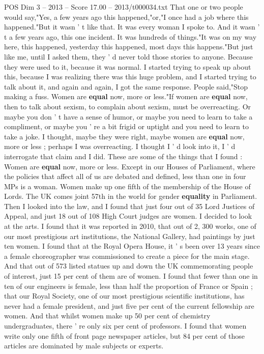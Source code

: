 \begin{textsample}{POS Dim 3 – 2013 – Score 17.00 – 2013/t000034.txt}
That one or two people would say,"Yes, a few years ago this happened,"or,"I once had a job where this happened."But it wasn ' t like that.
It was every woman I spoke to.
And it wasn ' t a few years ago, this one incident.
It was hundreds of things."It was on my way here, this happened, yesterday this happened, most days this happens."But just like me, until I asked them, they ' d never told those stories to anyone.
Because they were used to it, because it was normal.
I started trying to speak up about this, because I was realizing there was this huge problem, and I started trying to talk about it, and again and again, I got the same response.
People said,"Stop making a fuss.
Women are \textbf{equal} now, more or less."If women are \textbf{equal} now, then to talk about sexism, to complain about sexism, must be overreacting.
Or maybe you don ' t have a sense of humor, or maybe you need to learn to take a compliment, or maybe you ' re a bit frigid or uptight and you need to learn to take a joke.
I thought, maybe they were right, maybe women are \textbf{equal} now, more or less ; perhaps I was overreacting.
I thought I ' d look into it, I ' d interrogate that claim and I did.
These are some of the things that I found : Women are \textbf{equal} now, more or less.
Except in our Houses of Parliament, where the policies that affect all of us are debated and defined, less than one in four MPs is a woman.
Women make up one fifth of the membership of the House of Lords.
The UK comes joint 57th in the world for gender \textbf{equality} in Parliament.
Then I looked into the law, and I found that just four out of 35 Lord Justices of Appeal, and just 18 out of 108 High Court judges are women.
I decided to look at the arts.
I found that it was reported in 2010, that out of 2, 300 works, one of our most prestigious art institutions, the National Gallery, had paintings by just ten women.
I found that at the Royal Opera House, it ' s been over 13 years since a female choreographer was commissioned to create a piece for the main stage.
And that out of 573 listed statues up and down the UK commemorating people of interest, just 15 per cent of them are of women.
I found that fewer than one in ten of our engineers is female, less than half the proportion of France or Spain ; that our Royal Society, one of our most prestigious scientific institutions, has never had a female president, and just five per cent of the current fellowship are women.
And that whilst women make up 50 per cent of chemistry undergraduates, there ' re only six per cent of professors.
I found that women write only one fifth of front page newspaper articles, but 84 per cent of those articles are dominated by male subjects or experts.

\end{textsample}
